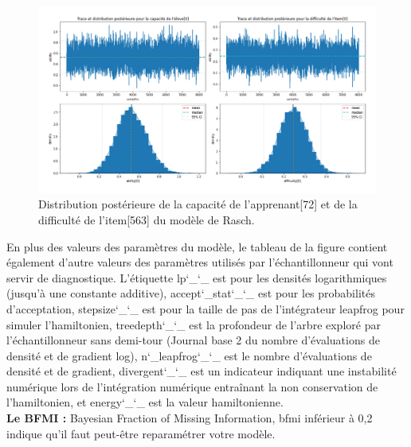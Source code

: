 \begin{figure}[H]
	\begin{center}
		\includegraphics[width=\textwidth]{images/chapitre7/params_posterior_distribution.png}
	\end{center}
	\caption{Distribution postérieure de la capacité de l’apprenant[72] et de la difficulté de l’item[563] du modèle de Rasch.}
	\label{params_posterior_distribution}
\end{figure}

\noindent En plus des valeurs des paramètres du modèle, le tableau de la figure contient également d’autre valeurs des paramètres utilisés par l'échantillonneur qui vont servir de diagnostique.
L'étiquette \colorbox{gray!30}{lp\char`_\char`_} est pour les densités logarithmiques (jusqu'à une constante additive), \colorbox{gray!30}{accept\char`_stat\char`_\char`_} est pour les probabilités d'acceptation, \colorbox{gray!30}{stepsize\char`_\char`_} est pour la taille de pas de l'intégrateur leapfrog pour simuler l'hamiltonien, \colorbox{gray!30}{treedepth\char`_\char`_} est la profondeur de l'arbre exploré par l'échantillonneur sans demi-tour (Journal base 2 du nombre d'évaluations de densité et de gradient log), \colorbox{gray!30}{n\char`_leapfrog\char`_\char`_} est le nombre d'évaluations de densité et de gradient, \colorbox{gray!30}{divergent\char`_\char`_} est un indicateur indiquant une instabilité numérique lors de l'intégration numérique entraînant la non conservation de l'hamiltonien, et \colorbox{gray!30}{energy\char`_\char`_} est la valeur hamiltonienne. \\

\noindent \textbf{Le BFMI :} Bayesian Fraction of Missing Information, bfmi inférieur à 0,2 indique qu’il faut peut-être reparamétrer votre modèle.

